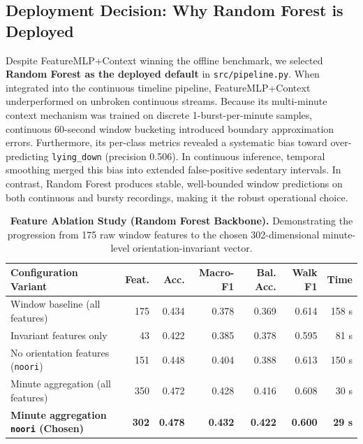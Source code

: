 \documentclass[11pt,a4paper]{article}
\begin{document}
\subsection{Deployment Decision: Why Random Forest is Deployed}
Despite FeatureMLP+Context winning the offline benchmark, we selected \textbf{Random Forest as the deployed default} in \texttt{src/pipeline.py}. When integrated into the continuous timeline pipeline, FeatureMLP+Context underperformed on unbroken continuous streams. Because its multi-minute context mechanism was trained on discrete 1-burst-per-minute samples, continuous 60-second window bucketing introduced boundary approximation errors. Furthermore, its per-class metrics revealed a systematic bias toward over-predicting \texttt{lying\_down} (precision 0.506). In continuous inference, temporal smoothing merged this bias into extended false-positive sedentary intervals. In contrast, Random Forest produces stable, well-bounded window predictions on both continuous and bursty recordings, making it the robust operational choice.

\begin{table}[h]
\centering
\small
\caption{\textbf{Feature Ablation Study (Random Forest Backbone).} Demonstrating the progression from 175 raw window features to the chosen 302-dimensional minute-level orientation-invariant vector.}
\label{tab:ablation}
\begin{tabular}{lrrrrrr}
\toprule
\textbf{Configuration Variant} & \textbf{Feat.} & \textbf{Acc.} & \textbf{Macro-F1} & \textbf{Bal. Acc.} & \textbf{Walk F1} & \textbf{Time} \\
\midrule
Window baseline (all features) & 175 & 0.434 & 0.378 & 0.369 & 0.614 & 158 s \\
Invariant features only & 43 & 0.422 & 0.385 & 0.378 & 0.595 & 81 s \\
No orientation features (\texttt{noori}) & 151 & 0.448 & 0.404 & 0.388 & 0.613 & 150 s \\
Minute aggregation (all features) & 350 & 0.472 & 0.428 & 0.416 & 0.608 & 30 s \\
\textbf{Minute aggregation \texttt{noori} (Chosen)} & \textbf{302} & \textbf{0.478} & \textbf{0.432} & \textbf{0.422} & \textbf{0.600} & \textbf{29 s} \\
\bottomrule
\end{tabular}
\end{table}
\end{document}
